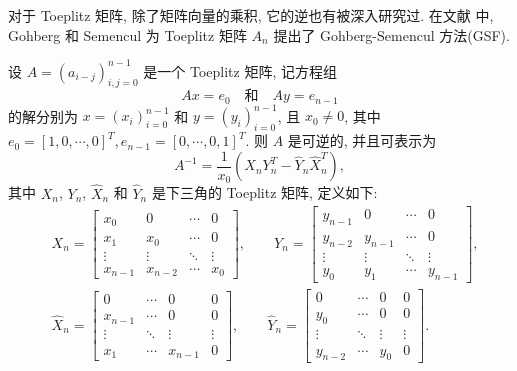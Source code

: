 \documentclass{ecnumaster}
\begin{document}
对于 Toeplitz 矩阵,
除了矩阵向量的乘积,
它的逆也有被深入研究过. 在文献 \cite{GS72} 中,
Gohberg 和 Semencul 为 Toeplitz 矩阵 $A_n$ 提出了 Gohberg-Semencul 方法(GSF).
\begin{theorem}\label{th47}
  设 $A = (a_{i-j})_{i, j = 0}^{n-1}$ 是一个 Toeplitz 矩阵, 记方程组
  \begin{equation}
    Ax = e_0 \quad\text{和}\quad Ay = e_{n-1}
  \end{equation}
  的解分别为 $x = (x_i)_{i=0}^{n-1}$ 和 $y = (y_i)_{i=0}^{n-1}$, 且 $x_0 \neq 0$,
  其中 $e_0 = [1, 0, \cdots, 0]^T, e_{n-1} = [0, \cdots, 0, 1]^T$.
  则 $A$ 是可逆的, 并且可表示为
  $$
    A^{-1} = \frac{1}{x_0}(X_nY_n^T - \hat{Y}_n\hat{X}_n^T),
  $$
  其中 $X_n$, $Y_n$, $\hat{X}_n$ 和 $\hat{Y}_n$ 是下三角的 Toeplitz 矩阵, 定义如下:
  \begin{align*}
    & X_n = \left[\begin{matrix} x_0 & 0 & \cdots & 0\\
    x_1 & x_0 & \cdots & 0\\
  \vdots & \vdots & \ddots & \vdots\\
  x_{n-1} & x_{n-2} & \cdots & x_0\end{matrix} \right],
  \qquad Y_n = \left[\begin{matrix} y_{n-1} & 0 & \cdots & 0\\
    y_{n-2} & y_{n-1} & \cdots & 0\\
  \vdots & \vdots & \ddots & \vdots\\
  y_0 & y_{1} & \cdots & y_{n-1}\end{matrix} \right], \\
  & \hat{X}_n = \left[\begin{matrix} 0 & \cdots & 0 & 0\\
    x_{n-1} & \cdots & 0 & 0\\
  \vdots & \ddots & \vdots & \vdots\\
  x_1 & \cdots & x_{n-1} & 0\end{matrix} \right],
  \qquad \hat{Y}_n = \left[\begin{matrix} 0 & \cdots & 0 & 0\\
    y_0 & \cdots & 0 & 0\\
  \vdots & \ddots & \vdots & \vdots\\
  y_{n-2} & \cdots & y_0 & 0\end{matrix} \right].
  \end{align*}
\end{theorem}
\end{document}
